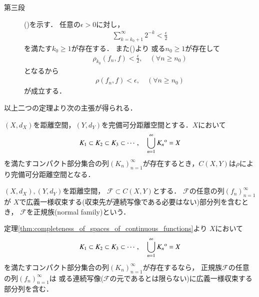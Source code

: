 \begin{prf}
\begin{description}
			\item[第三段]
				()を示す．
				任意の$\epsilon > 0$に対し，
				\begin{align}
					\sum_{k=k_0+1}^\infty 2^{-k} < \frac{\epsilon}{2}
				\end{align}
				を満たす$k_0 \geq 1$が存在する．
				また()より
				或る$n_0 \geq 1$が存在して
				\begin{align}
					\rho_{k_0}(f_n,f) < \frac{\epsilon}{2},
					\quad (\forall n \geq n_0)
				\end{align}
				となるから
				\begin{align}
					\rho(f_n,f) < \epsilon, \quad (\forall n \geq n_0)
				\end{align}
				が成立する．
				\QED
		\end{description}
	\end{prf}
	
	以上二つの定理より次の主張が得られる．
	\begin{screen}
		\begin{thm}[$C(X,Y)$の完備可分性]\label{thm:appendix_complete_separability_of_spaces_of_continuous_functions}
			$(X,d_X)$を距離空間，$(Y,d_Y)$を完備可分距離空間とする．$X$において
			\begin{align}
				K_1 \subset K_2 \subset K_3 \subset \cdots,
				\quad \bigcup_{n=1}^\infty {\kern0ptK_n}^{\mathrm{o}} = X
			\end{align}
			を満たすコンパクト部分集合の列$(K_n)_{n=1}^\infty$が存在するとき，$C(X,Y)$は$\rho$により完備可分距離空間となる．
		\end{thm}
	\end{screen}
	
	\begin{screen}
		\begin{dfn}[正規族]
			$(X,d_X),(Y,d_Y)$を距離空間，
			$\mathscr{F} \subset C(X,Y)$とする．
			$\mathscr{F}$の任意の列$(f_n)_{n=1}^\infty$が
			$X$で広義一様収束する(収束先が連続写像である必要はない)部分列を含むとき，
			$\mathscr{F}$を正規族(normal family)という．
		\end{dfn}
	\end{screen}
	
	定理\ref{thm:completeness_of_spaces_of_continuous_functions}より
	$X$において
	\begin{align}
		K_1 \subset K_2 \subset K_3 \subset \cdots,
		\quad \bigcup_{n=1}^\infty {\kern0ptK_n}^{\mathrm{o}} = X
	\end{align}
	を満たすコンパクト部分集合の列$(K_n)_{n=1}^\infty$が存在するなら，
	正規族$\mathscr{F}$の任意の列$(f_n)_{n=1}^\infty$は
	或る連続写像($\mathscr{F}$の元であるとは限らない)に広義一様収束する部分列を含む．
	
